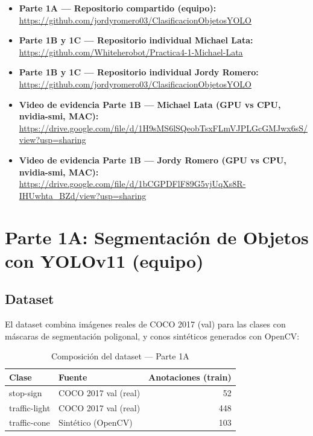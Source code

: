 \documentclass[12pt,a4paper]{article}
\let\oldsubsection\subsection
\renewcommand{\subsection}[1]{\needspace{5\baselineskip}\oldsubsection{#1}}
\begin{document}
\begin{itemize}
  \item \textbf{Parte 1A — Repositorio compartido (equipo):}\\
        \url{https://github.com/jordyromero03/ClasificacionObjetosYOLO}

  \item \textbf{Parte 1B y 1C — Repositorio individual Michael Lata:}\\
        \url{https://github.com/Whiteherobot/Practica4-1-Michael-Lata}

  \item \textbf{Parte 1B y 1C — Repositorio individual Jordy Romero:}\\
        \url{https://github.com/jordyromero03/ClasificacionObjetosYOLO}

  \item \textbf{Video de evidencia Parte 1B — Michael Lata (GPU vs CPU, nvidia-smi, MAC):}\\
        \url{https://drive.google.com/file/d/1H9sMS6lSQeobTsxFLmVJPLGcGMJwx6sS/view?usp=sharing}

  \item \textbf{Video de evidencia Parte 1B — Jordy Romero (GPU vs CPU, nvidia-smi, MAC):}\\
        \url{https://drive.google.com/file/d/1bCGPDFlF89G5vjUqXs8R-IHUwhta_BZd/view?usp=sharing}
\end{itemize}

\section{Parte 1A: Segmentación de Objetos con YOLOv11 (equipo)}

\subsection{Dataset}

El dataset combina imágenes reales de COCO 2017 (val) para las clases con máscaras de segmentación poligonal, y conos sintéticos generados con OpenCV:

\begin{table}[htbp]
  \centering
  \caption{Composición del dataset — Parte 1A}
  \begin{tabular}{llr}
    \toprule
    \textbf{Clase} & \textbf{Fuente} & \textbf{Anotaciones (train)} \\
    \midrule
    stop-sign     & COCO 2017 val (real)   & 52  \\
    traffic-light & COCO 2017 val (real)   & 448 \\
    traffic-cone  & Sintético (OpenCV)     & 103 \\
    \bottomrule
  \end{tabular}
\end{table}
\end{document}
